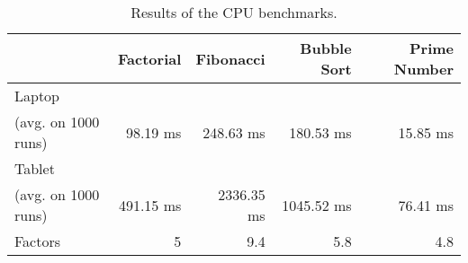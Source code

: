 \begin {table}[htpb] 
  \centering
\begin {tabular} {|l|r|r|r|r|}
	\hline
		&Factorial&Fibonacci&Bubble Sort&Prime Number\\
	\hline
	Laptop&&&&\\
	(avg. on 1000 runs)&98.19 ms&248.63 ms&180.53 ms&15.85 ms\\
	\hline
	Tablet&&&&\\
	(avg. on 1000 runs)&491.15 ms&2336.35 ms&1045.52 ms&76.41 ms\\
	\hline
	\hline
	Factors&5&9.4&5.8&4.8\\
	\hline
\end {tabular}
\caption {Results of the CPU benchmarks.}
\label {tab:cpu-results}
\end {table}

